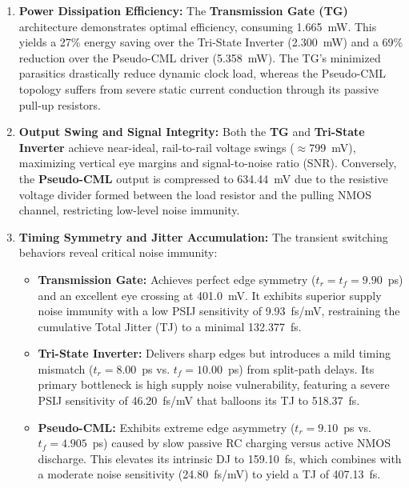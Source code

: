 \begin{enumerate}[label=\textbf{\arabic*.}, leftmargin=*]
    \item \textbf{Power Dissipation Efficiency:} 
    The \textbf{Transmission Gate (TG)} architecture demonstrates optimal efficiency, consuming 1.665~mW. This yields a 27\% energy saving over the Tri-State Inverter (2.300~mW) and a 69\% reduction over the Pseudo-CML driver (5.358~mW). The TG's minimized parasitics drastically reduce dynamic clock load, whereas the Pseudo-CML topology suffers from severe static current conduction through its passive pull-up resistors.

    \item \textbf{Output Swing and Signal Integrity:} 
    Both the \textbf{TG} and \textbf{Tri-State Inverter} achieve near-ideal, rail-to-rail voltage swings ($\approx$799~mV), maximizing vertical eye margins and signal-to-noise ratio (SNR). Conversely, the \textbf{Pseudo-CML} output is compressed to 634.44~mV due to the resistive voltage divider formed between the load resistor and the pulling NMOS channel, restricting low-level noise immunity.

    \item \textbf{Timing Symmetry and Jitter Accumulation:} 
    The transient switching behaviors reveal critical noise immunity:
    \begin{itemize}[leftmargin=1.5em]
        \item \textbf{Transmission Gate:} Achieves perfect edge symmetry ($t_r = t_f = 9.90$~ps) and an excellent eye crossing at 401.0~mV. It exhibits superior supply noise immunity with a low PSIJ sensitivity of 9.93~fs/mV, restraining the cumulative Total Jitter (TJ) to a minimal 132.377~fs.
        \item \textbf{Tri-State Inverter:} Delivers sharp edges but introduces a mild timing mismatch ($t_r = 8.00$~ps vs. $t_f = 10.00$~ps) from split-path delays. Its primary bottleneck is high supply noise vulnerability, featuring a severe PSIJ sensitivity of 46.20~fs/mV that balloons its TJ to 518.37~fs.
        \item \textbf{Pseudo-CML:} Exhibits extreme edge asymmetry ($t_r = 9.10$~ps vs. $t_f = 4.905$~ps) caused by slow passive RC charging versus active NMOS discharge. This elevates its intrinsic DJ to 159.10~fs, which combines with a moderate noise sensitivity (24.80~fs/mV) to yield a TJ of 407.13~fs.
    \end{itemize}
\end{enumerate}

